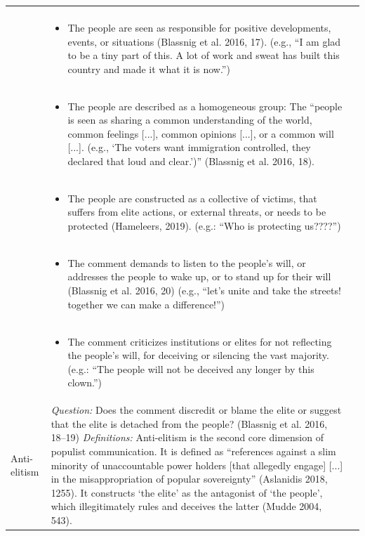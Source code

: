 \documentclass[
]{ccr}
\begin{document}
{\begin{spacing}{1}
\begin{longtable}[]{@{}
  >{\raggedright\arraybackslash}p{.14\linewidth}
  >{\raggedright\arraybackslash}p{.62\linewidth}
  >{\raggedright\arraybackslash}p{.13\linewidth}@{}}
\begin{itemize}
\end{itemize}
&
\\
&
\begin{itemize}
\item The people are seen as responsible for positive developments, events, or situations (Blassnig et al. 2016, 17). (e.g., “I am glad to be a tiny part of this. A lot of work and sweat has built this country and made it what it is now.”)
\end{itemize}
&
\\
&
\begin{itemize}\item The people are described as a homogeneous group: The “people is seen as sharing a common understanding of the world, common feelings [...], common opinions [...], or a common will [...].  (e.g., ‘The voters want immigration controlled, they declared that loud and clear.’)” (Blassnig et al. 2016, 18).
\end{itemize}
&
\\
&
\begin{itemize}\item The people are constructed as a collective of victims, that suffers from elite actions, or external threats, or needs to be protected (Hameleers, 2019). (e.g.: “Who is protecting us????”)
\end{itemize}
&
\\
&
\begin{itemize}\item The comment demands to listen to the people’s will, or addresses the people to wake up, or to stand up for their will (Blassnig et al. 2016, 20) (e.g., “let’s unite and take the streets! together we can make a difference!”)
\end{itemize}
&
\\
&
\begin{itemize}\item The comment criticizes institutions or elites for not reflecting the people’s will, for deceiving or silencing the vast majority. (e.g.: “The people will not be deceived any longer by this clown.”)
\end{itemize}
&
\\
Anti-elitism & 
\emph{Question:} \newline Does the comment discredit or blame the elite or suggest that the elite is detached from the people? (Blassnig et al. 2016, 18–19) \newline \newline
\emph{Definitions:} \newline Anti-elitism is the second core dimension of populist communication. It is defined as “references against a slim minority of unaccountable power holders [that allegedly engage] [...] in the misappropriation of popular sovereignty” (Aslanidis 2018, 1255). It constructs ‘the elite’ as the antagonist of ‘the people’, which illegitimately rules and deceives the latter (Mudde 2004, 543).

\end{longtable}
\end{spacing}}
\end{document}

